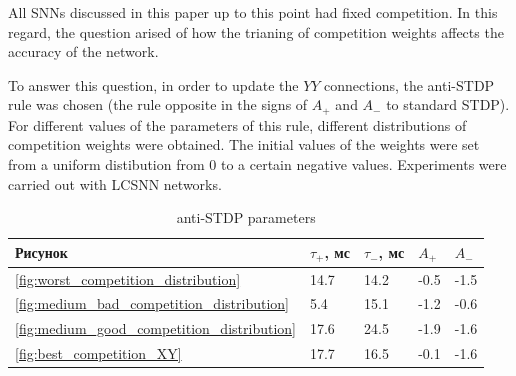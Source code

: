 \documentclass[a4paper]{article}
\begin{document}
All SNNs discussed in this paper up to this point had fixed competition. In this regard, the question arised of how the trianing of competition weights affects the accuracy of the network.

To answer this question, in order to update the $ YY $ connections, the anti-STDP rule was chosen (the rule opposite in the signs of $ A_{+} $ and $ A_{-} $ to standard STDP). For different values of the parameters of this rule, different distributions of competition weights were obtained. The initial values of the weights were set from a uniform distibution from 0 to a certain negative values. Experiments were carried out with LCSNN networks.

\begin{table}
 \caption{anti-STDP parameters}
\begin{center}
\begin{tabular}{|l|l|l|l|l|}
\hline
Рисунок & {$\tau_{+}$, мс} & {$\tau_{-}$, мс} & {$A_{+}$} & {$A_{-}$} \\
\hline
\ref{fig:worst_competition_distribution} & 14.7 & 14.2 & -0.5 & -1.5 \\
\hline
\ref{fig:medium_bad_competition_distribution} & 5.4 & 15.1 & -1.2 & -0.6 \\
\hline
\ref{fig:medium_good_competition_distribution} & 17.6 & 24.5 & -1.9 & -1.6 \\
\hline
\ref{fig:best_competition_XY} & 17.7 & 16.5 & -0.1 & -1.6\\
\hline
\end{tabular}
\end{center}
\end{table}
\end{document}
